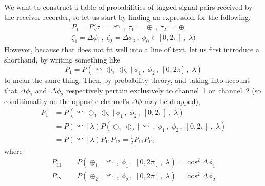 \documentclass[9pt,technote]{IEEEtran}
\begin{document}
We want to construct a table of probabilities of tagged signal pairs
received by the receiver-recorder, so let us start by finding an
expression for the following.
\begin{multline}
  P_1 = P(\sigma=\,\curvearrowleft\,,\; \tau_1=\,\oplus\,,\; \tau_2=\,\oplus \,| \\
  \zeta_1=\Delta\phi_1\,,\; \zeta_2=\Delta\phi_2\,,\; \phi_0\in[0,2\pi]\,,\; \lambda)
\end{multline}
However, because that does not fit well into a line of text, let us
first introduce a shorthand, by writing something like
\begin{equation}
  P_1 = P(\curvearrowleft\,\oplus_1\,\oplus_2\,|\,\phi_1\,,\; \phi_2\,,\;
  [0,2\pi]\,,\; \lambda)
\end{equation}
to mean the same thing. Then, by probability theory, and taking into
account that $\Delta\phi_1$ and~$\Delta\phi_2$ respectively pertain
exclusively to channel~1 or~channel~2 (so conditionality on the
opposite channel's $\Delta\phi$ may be dropped),
\begin{align}
  P_1 &= P(\curvearrowleft\,\oplus_1\,\oplus_2\,|\,\phi_1\,,\; \phi_2\,,\; [0,2\pi]\,,\; \lambda) \\
      &= P(\curvearrowleft\,|\, \lambda) P(\oplus_1\,\oplus_2\,|\,\curvearrowleft\,,\;\phi_1\,,\; \phi_2\,,\; [0,2\pi]\,,\; \lambda) \\
      &= P(\curvearrowleft\,|\, \lambda) P_{11} P_{12} = \frac{1}{2} P_{11} P_{12}
\end{align}
where
\begin{align}
  P_{11} &= P(\oplus_1\,|\,\curvearrowleft\,,\;\phi_1\,,\; [0,2\pi]\,,\; \lambda) = \cos^2 \Delta\phi_1 \\
  P_{12} &= P(\oplus_2\,|\,\curvearrowleft\,,\; \phi_2\,,\; [0,2\pi]\,,\; \lambda) = \cos^2 \Delta\phi_2
\end{align}
\end{document}

